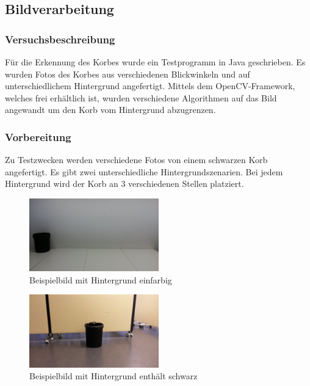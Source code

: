 \subsection{Bildverarbeitung}

\subsubsection{Versuchsbeschreibung}
Für die Erkennung des Korbes wurde ein Testprogramm in Java geschrieben. Es wurden Fotos des Korbes aus verschiedenen Blickwinkeln und auf unterschiedlichem Hintergrund angefertigt. Mittels dem OpenCV-Framework, welches frei erhältlich ist, wurden verschiedene Algorithmen auf das Bild angewandt um den Korb vom Hintergrund abzugrenzen.

\subsubsection{Vorbereitung}
Zu Testzwecken werden verschiedene Fotos von einem schwarzen Korb angefertigt. 
Es gibt zwei unterschiedliche Hintergrundszenarien. Bei jedem Hintergrund wird der 
Korb an 3 verschiedenen Stellen platziert.

\begin{figure}[h!]
    \centering
    \includegraphics[width=0.5\textwidth]{fig/korb4.jpg}
    \caption{Beispielbild mit Hintergrund einfarbig}
    \label{fig:Korb_HEinfarbig}
\end{figure}

\begin{figure}[h!]
    \centering
    \includegraphics[width=0.5\textwidth]{fig/korb1.jpg}
    \caption{Beispielbild mit Hintergrund enthält schwarz}
    \label{fig:Korb_HSchwarz}
\end{figure}

